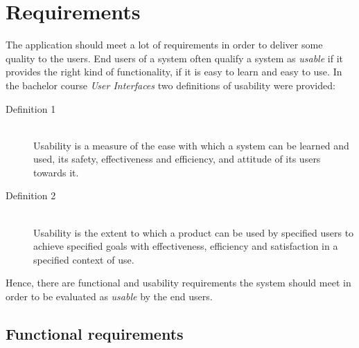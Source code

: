 \chapter{Requirements}\label{ch:requirements}

The application should meet a lot of requirements in order to deliver some quality to the users. End users of a system often qualify a system as \textit{usable} if it provides the right kind of functionality, if it is easy to learn and easy to use.
In the bachelor course \textit{User Interfaces} \citep{ui_course_detroyer} two definitions of usability were provided:
\begin{description}
	\item[Definition 1] \hfill \\
	Usability is a measure of the ease with which a system can be learned and used, its safety, effectiveness and efficiency, and attitude of its users towards it. \hfill \citep{usability-definition-preece}

	\item[Definition 2] \hfill \\
	Usability is the extent to which a product can be used by specified users to achieve specified goals with effectiveness, efficiency and satisfaction in a specified context of use. \hfill \citep{usability-definition-improved}
\end{description}

Hence, there are functional and usability requirements the system should meet in order to be evaluated as \textit{usable} by the end users.

\section{Functional requirements}\label{sec:functional-requirements}

